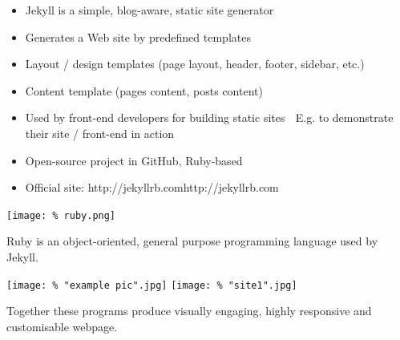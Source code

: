 \documentclass[unknownkeysallowed,usepdftitle=false, aspectratio=169, parskip=full]{beamer}
\newcommand{\secvariable}{nothing}
\newcommand{\mysection}[1]{\renewcommand{\secvariable}{#1}
}
\begin{document}
\mysection{major}
\begin{frame}\label{\secvariable}
\begin{itemize}
\item Jekyll is a simple, blog-aware, static site generator
\item Generates a Web site by predefined templates
\item Layout / design templates (page layout, header, footer, sidebar, etc.)
\item Content template (pages content, posts content)
\item Used by front-end developers for building static sites  E.g. to demonstrate their site / front-end in action
\item Open-source project in GitHub, Ruby-based
\item Official site: http://jekyllrb.comhttp://jekyllrb.com 
\end{itemize}


\end{frame}

\mysection{minor}
\begin{frame}\label{\secvariable} %
\begin{center}
\texttt{[image: \%
ruby.png]}
\end{center}
\vspace{-0.2cm}

Ruby is an object-oriented, general purpose programming language used by Jekyll.
\end{frame}


\begin{frame}\label{\secvariable}

%
\texttt{[image: \%
"example pic".jpg]}\hspace{.05\textwidth}
\texttt{[image: \%
"site1".jpg]}

Together these programs produce  visually engaging, highly responsive and customisable webpage.

\end{frame}
\end{document}
